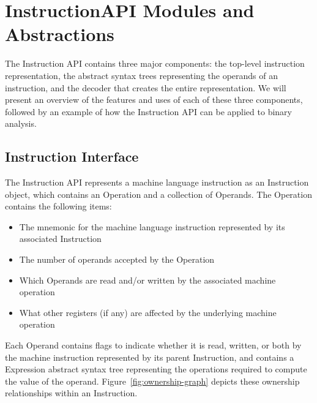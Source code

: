 \section{InstructionAPI Modules and Abstractions}

The Instruction API contains three major components: the top-\/level instruction
representation, the abstract syntax trees representing the operands of an
instruction, and the decoder that creates the entire representation. We will
present an overview of the features and uses of each of these three components,
followed by an example of how the Instruction API can be applied to binary
analysis. 

\subsection{Instruction Interface}

The Instruction API represents a machine language instruction as an Instruction
object, which contains an Operation and a collection of Operands. The Operation
contains the following items:

\begin{itemize}
\item The mnemonic for the machine language instruction represented by its associated Instruction
\item The number of operands accepted by the Operation
\item Which Operands are read and/or written by the associated machine operation
\item What other registers (if any) are affected by the underlying machine operation
\end{itemize}

Each Operand contains flags to indicate whether it is read, written, or both by
the machine instruction represented by its parent Instruction, and contains a
Expression abstract syntax tree representing the operations required to compute
the value of the operand. Figure~\ref{fig:ownership-graph} depicts these
ownership relationships within an Instruction. 

